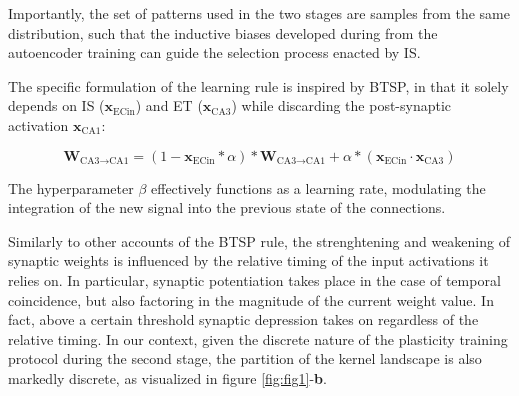 Importantly, the set of patterns used in the two stages are samples from the same distribution, such that the inductive biases developed during from the autoencoder training can guide the selection process enacted by IS.

The specific formulation of the learning rule is inspired by BTSP, in that it solely depends on IS ($\textbf{x}_{\text{ECin}}$) and ET ($\textbf{x}_{\text{CA3}}$) while discarding the post-synaptic activation $\textbf{x}_{\text{CA1}}$:

\begin{equation}
    \textbf{W}_{\text{CA3}\to\text{CA1}} = (1-\textbf{x}_{\text{ECin}}*\alpha) * \textbf{W}_{\text{CA3}\to \text{CA1}} + \alpha * (\textbf{x}_{\text{ECin}} \cdot \textbf{x}_{\text{CA3}})
\end{equation}

\noindent The hyperparameter $\beta$ effectively functions as a learning rate, modulating the integration of the new signal into the previous state of the connections.

Similarly to other accounts of the BTSP rule, the strenghtening and weakening of synaptic weights is influenced by the relative timing of the input activations it relies on.
In particular, synaptic potentiation takes place in the case of temporal coincidence, but also factoring in the magnitude of the current weight value. In fact, above a certain threshold synaptic depression takes on regardless of the relative timing.
In our context, given the discrete nature of the plasticity training protocol during the second stage, the partition of the kernel landscape is also markedly discrete, as visualized in figure \ref{fig:fig1}-\textbf{b}.



